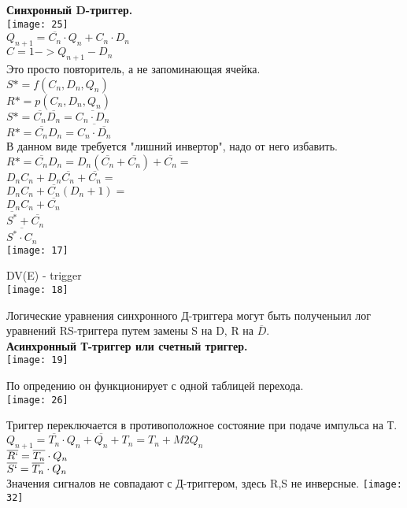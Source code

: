 \textbf {Синхронный D-триггер.}\\
\texttt{[image: 25]}\\
$Q_{n+1} = \overline{C_n} \cdot Q_n + C_n \cdot D_n $\\
$C = 1  -> Q_{n+1} - D_n $\\


Это просто повторитель, а не запоминающая ячейка.\\
$S* = f(C_n, D_n,Q_n) $\\
$R* = p(C_n, D_n,Q_n) $\\
$S* = \overline{C_n} \overline{D_n} = \overline{C_n \cdot D_n} $\\
$R* = \overline{C_n} D_n = \overline{C_n \cdot \overline{D_n}} $\\
В данном виде требуется "лишний инвертор", надо от него избавить.\\
$R* = \overline{C_n} D_n = D_n(\overline{C_n} + \overline{C_n}) + \overline{C_n} = $\\
$D_n C_n  + D_n \overline{ C_n} + \overline{C_n} = $\\
$ D_n C_n  + \overline{C_n}(D_n + 1) = $\\
$D_n C_n + \overline{C_n}  $\\
$\overline{S^*}  + \overline{C_n}$ \\
$ \overline{S^* \cdot C_n}$\\
\texttt{[image: 17]}

DV(E) - trigger\\
\texttt{[image: 18]}

Логические уравнения синхронного Д-триггера могут быть полученыил лог уравнений RS-триггера путем замены S на D, R на $\overline{D}$.\\
\newpage
\textbf {Асинхронный Т-триггер или счетный триггер.}\\
\texttt{[image: 19]}

По опредению он функционирует с одной таблицей перехода. \\
\texttt{[image: 26]}

Триггер переключается в противоположное состояние при подаче импульса на Т.\\
$Q_{n+1} = \overline{T_n} \cdot Q_n + \overline{Q_n} + T_n = T_n +M2 Q_n $\\
$\overline{R`} = \overline{T_n} \cdot Q_n$\\
$\overline{S`} = \overline{T_n} \cdot Q_n$\\
\newpage
Значения сигналов не совпадают с Д-триггером, здесь R,S не инверсные.
\texttt{[image: 32]}\\

